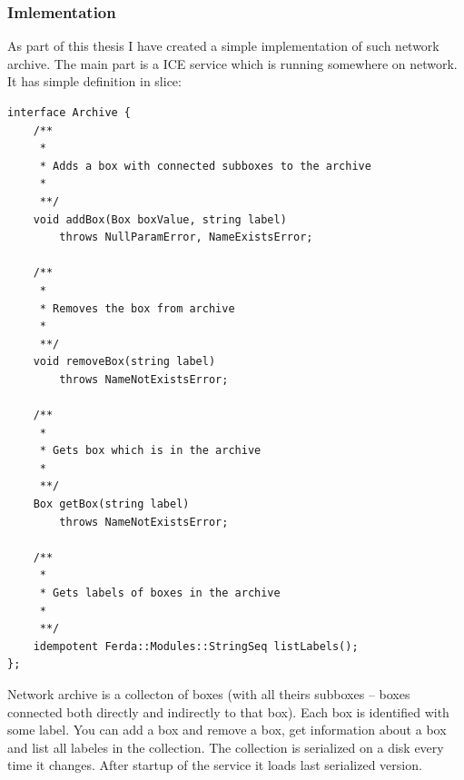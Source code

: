 \documentclass{article}
\begin{document}
\subsubsection{Imlementation}
As part of this thesis I have created a simple implementation of such network archive. The main part is a ICE service which is running somewhere on network. It has simple definition in slice:
\begin{verbatim}
interface Archive {
	/**
	 *
	 * Adds a box with connected subboxes to the archive
	 *
	 **/
	void addBox(Box boxValue, string label)
		throws NullParamError, NameExistsError;

	/**
	 *
	 * Removes the box from archive
	 *
	 **/
	void removeBox(string label)
		throws NameNotExistsError;

	/**
	 *
	 * Gets box which is in the archive
	 *
	 **/
	Box getBox(string label)
		throws NameNotExistsError;

	/**
	 *
	 * Gets labels of boxes in the archive
	 *
	 **/
	idempotent Ferda::Modules::StringSeq listLabels();
};
\end{verbatim}

Network archive is a collecton of boxes (with all theirs subboxes -- boxes connected both directly and indirectly to that box). Each box is identified with some label. You can add a box and remove a box, get information about a box and list all labeles in the collection. The collection is serialized on a disk every time it changes. After startup of the service it loads last serialized version.
\end{document}
